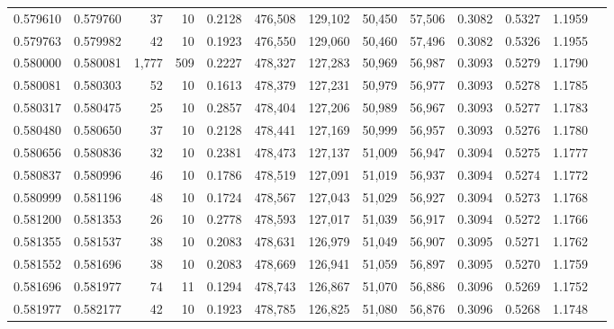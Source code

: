 \begin{tabular}{rrrrrrrrrrrrr}
0.579610 & 0.579760 &    37 &  10 &                                     0.2128 & 476,508 & 129,102 &  50,450 &  57,506 & 0.3082 & 0.5327 & 1.1959 \\
0.579763 & 0.579982 &    42 &  10 &                                     0.1923 & 476,550 & 129,060 &  50,460 &  57,496 & 0.3082 & 0.5326 & 1.1955 \\
0.580000 & 0.580081 & 1,777 & 509 &                                     0.2227 & 478,327 & 127,283 &  50,969 &  56,987 & 0.3093 & 0.5279 & 1.1790 \\
0.580081 & 0.580303 &    52 &  10 &                                     0.1613 & 478,379 & 127,231 &  50,979 &  56,977 & 0.3093 & 0.5278 & 1.1785 \\
0.580317 & 0.580475 &    25 &  10 &                                     0.2857 & 478,404 & 127,206 &  50,989 &  56,967 & 0.3093 & 0.5277 & 1.1783 \\
0.580480 & 0.580650 &    37 &  10 &                                     0.2128 & 478,441 & 127,169 &  50,999 &  56,957 & 0.3093 & 0.5276 & 1.1780 \\
0.580656 & 0.580836 &    32 &  10 &                                     0.2381 & 478,473 & 127,137 &  51,009 &  56,947 & 0.3094 & 0.5275 & 1.1777 \\
0.580837 & 0.580996 &    46 &  10 &                                     0.1786 & 478,519 & 127,091 &  51,019 &  56,937 & 0.3094 & 0.5274 & 1.1772 \\
0.580999 & 0.581196 &    48 &  10 &                                     0.1724 & 478,567 & 127,043 &  51,029 &  56,927 & 0.3094 & 0.5273 & 1.1768 \\
0.581200 & 0.581353 &    26 &  10 &                                     0.2778 & 478,593 & 127,017 &  51,039 &  56,917 & 0.3094 & 0.5272 & 1.1766 \\
0.581355 & 0.581537 &    38 &  10 &                                     0.2083 & 478,631 & 126,979 &  51,049 &  56,907 & 0.3095 & 0.5271 & 1.1762 \\
0.581552 & 0.581696 &    38 &  10 &                                     0.2083 & 478,669 & 126,941 &  51,059 &  56,897 & 0.3095 & 0.5270 & 1.1759 \\
0.581696 & 0.581977 &    74 &  11 &                                     0.1294 & 478,743 & 126,867 &  51,070 &  56,886 & 0.3096 & 0.5269 & 1.1752 \\
0.581977 & 0.582177 &    42 &  10 &                                     0.1923 & 478,785 & 126,825 &  51,080 &  56,876 & 0.3096 & 0.5268 & 1.1748 \\

\end{tabular}
